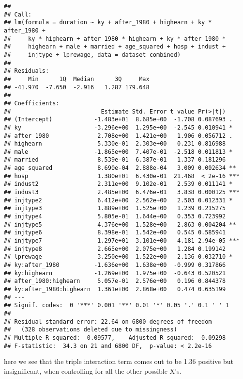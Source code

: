 \documentclass[
]{article}
\begin{document}
\begin{verbatim}
## 
## Call:
## lm(formula = duration ~ ky + after_1980 + highearn + ky * after_1980 + 
##     ky * highearn + after_1980 * highearn + ky * after_1980 * 
##     highearn + male + married + age_squared + hosp + indust + 
##     injtype + lprewage, data = dataset_combined)
## 
## Residuals:
##     Min      1Q  Median      3Q     Max 
## -41.970  -7.650  -2.916   1.287 179.648 
## 
## Coefficients:
##                          Estimate Std. Error t value Pr(>|t|)    
## (Intercept)            -1.483e+01  8.685e+00  -1.708 0.087693 .  
## ky                     -3.296e+00  1.295e+00  -2.545 0.010941 *  
## after_1980              2.708e+00  1.421e+00   1.906 0.056712 .  
## highearn                5.330e-01  2.303e+00   0.231 0.816988    
## male                   -1.865e+00  7.407e-01  -2.518 0.011813 *  
## married                 8.539e-01  6.387e-01   1.337 0.181296    
## age_squared             8.690e-04  2.888e-04   3.009 0.002634 ** 
## hosp                    1.380e+01  6.430e-01  21.468  < 2e-16 ***
## indust2                 2.311e+00  9.102e-01   2.539 0.011141 *  
## indust3                 2.485e+00  6.476e-01   3.838 0.000125 ***
## injtype2                6.412e+00  2.562e+00   2.503 0.012331 *  
## injtype3                1.889e+00  1.525e+00   1.239 0.215275    
## injtype4                5.805e-01  1.644e+00   0.353 0.723992    
## injtype5                4.376e+00  1.528e+00   2.863 0.004204 ** 
## injtype6                8.398e-01  1.542e+00   0.545 0.585941    
## injtype7                1.297e+01  3.101e+00   4.181 2.94e-05 ***
## injtype8                2.665e+00  2.075e+00   1.284 0.199142    
## lprewage                3.250e+00  1.522e+00   2.136 0.032710 *  
## ky:after_1980          -1.636e+00  1.638e+00  -0.999 0.317866    
## ky:highearn            -1.269e+00  1.975e+00  -0.643 0.520521    
## after_1980:highearn     5.057e-01  2.576e+00   0.196 0.844378    
## ky:after_1980:highearn  1.361e+00  2.868e+00   0.474 0.635199    
## ---
## Signif. codes:  0 '***' 0.001 '**' 0.01 '*' 0.05 '.' 0.1 ' ' 1
## 
## Residual standard error: 22.64 on 6800 degrees of freedom
##   (328 observations deleted due to missingness)
## Multiple R-squared:  0.09577,    Adjusted R-squared:  0.09298 
## F-statistic:  34.3 on 21 and 6800 DF,  p-value: < 2.2e-16
\end{verbatim}

here we see that the triple interaction term comes out to be 1.36
positive but insignificant, when controlling for all the other possible
X's.
\end{document}
